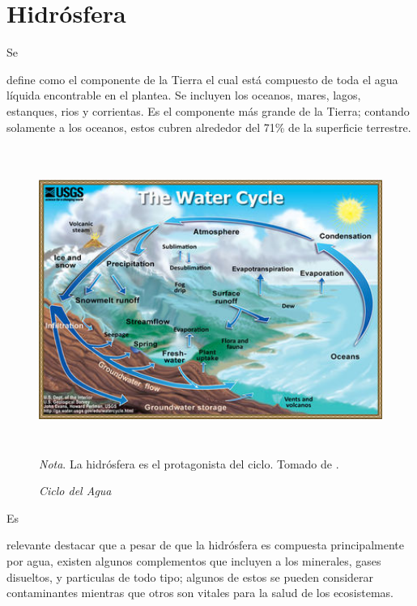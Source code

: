 \documentclass[stu, 12pt, letterpaper, donotrepeattitle, floatsintext, natbib]{apa7}
\begin{document}
\section{Hidrósfera}
Se \begin{justifying}
    define como el componente de la Tierra el cual está compuesto de toda el agua líquida encontrable
    en el plantea. Se incluyen los oceanos, mares, lagos, estanques, rios y corrientas. Es el componente
    más grande de la Tierra; contando solamente a los oceanos, estos cubren alrededor del 71\% de la superficie
    terrestre. \citep{hanania-2016}
    \par
\end{justifying}
\begin{figure}[H]
    \caption{\emph{Ciclo del Agua}}
    \centering
    \includegraphics[width=14cm,height=10cm]{hydrosphere.jpg}
    \bigskip
    \\\small\textit{Nota}. La hidrósfera es el protagonista del ciclo. Tomado de \cite{hanania-2016}. %
\end{figure}
Es \begin{justifying}
    relevante destacar que a pesar de que la hidrósfera es compuesta principalmente por agua, existen algunos
    complementos que incluyen a los minerales, gases disueltos, y particulas de todo tipo; algunos de estos se pueden
    considerar contaminantes mientras que otros son vitales para la salud de los ecosistemas.\par
\end{justifying}
\vspace{\baselineskip}
\end{document}
